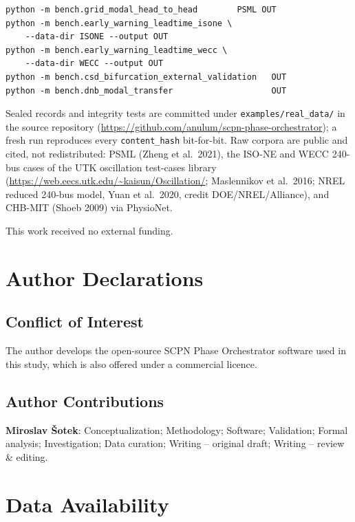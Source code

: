 \documentclass[aip,cha,preprint,amsmath,amssymb]{revtex4-2}
\newcommand{\code}[1]{\texttt{#1}}
\begin{document}
{\scriptsize\begin{verbatim}
python -m bench.grid_modal_head_to_head        PSML OUT
python -m bench.early_warning_leadtime_isone \
    --data-dir ISONE --output OUT
python -m bench.early_warning_leadtime_wecc \
    --data-dir WECC --output OUT
python -m bench.csd_bifurcation_external_validation   OUT
python -m bench.dnb_modal_transfer                    OUT
\end{verbatim}}

Sealed records and integrity tests are committed under
\code{examples/real\_data/} in the source repository
(\url{https://github.com/anulum/scpn-phase-orchestrator}); a fresh run
reproduces every \code{content\_hash} bit-for-bit. Raw corpora are
public and cited, not redistributed: PSML (Zheng et al.\ 2021), the
ISO-NE and WECC 240-bus cases of the UTK oscillation test-cases library
(\url{https://web.eecs.utk.edu/~kaisun/Oscillation/}; Maslennikov et
al.\ 2016; NREL reduced 240-bus model, Yuan et al.\ 2020, credit
DOE/NREL/Alliance), and
CHB-MIT (Shoeb 2009) via PhysioNet.

\begin{acknowledgments}
This work received no external funding.
\end{acknowledgments}

\section*{Author Declarations}

\subsection*{Conflict of Interest}

The author develops the open-source SCPN Phase Orchestrator software
used in this study, which is also offered under a commercial licence.

\subsection*{Author Contributions}

\textbf{Miroslav \v{S}otek}: Conceptualization; Methodology; Software;
Validation; Formal analysis; Investigation; Data curation;
Writing -- original draft; Writing -- review \& editing.

\section*{Data Availability}
\end{document}
